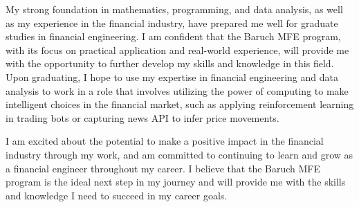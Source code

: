 \documentclass[a4paper,english]{article}
\begin{document}
My strong foundation in mathematics, programming, and data analysis, as well as my experience in the financial industry, have prepared me well for graduate studies in financial engineering. I am confident that the Baruch MFE program, with its focus on practical application and real-world experience, will provide me with the opportunity to further develop my skills and knowledge in this field. Upon graduating, I hope to use my expertise in financial engineering and data analysis to work in a role that involves utilizing the power of computing to make intelligent choices in the financial market, such as applying reinforcement learning in trading bots or capturing news API to infer price movements.

I am excited about the potential to make a positive impact in the financial industry through my work, and am committed to continuing to learn and grow as a financial engineer throughout my career. I believe that the Baruch MFE program is the ideal next step in my journey and will provide me with the skills and knowledge I need to succeed in my career goals.
\end{document}
